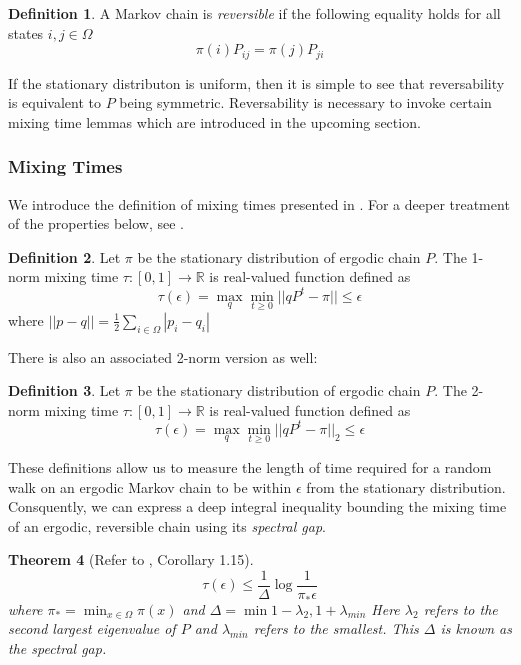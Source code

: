 \documentclass[12pt]{amsart}
\newtheorem{theorem}{Theorem}[section]
\theoremstyle{definition}
\newtheorem{definition}[theorem]{Definition}
\theoremstyle{remark}
\numberwithin{equation}{section}
\theoremstyle{remark}
\begin{document}
%
%
%
\begin{definition}
A Markov chain is \emph{reversible} if the following equality holds for all states $i,j \in \Omega$
\begin{equation}
  \pi(i)P_{ij} = \pi(j)P_{ji}
\end{equation}
\end{definition}
\noindent If the stationary distributon is uniform, then it is simple to see that reversability is equivalent to $P$ being symmetric. Reversability is necessary to invoke certain mixing time lemmas which are introduced in the upcoming section.

\subsubsection{Mixing Times}
We introduce the definition of mixing times presented in \cite{harrlow}. For a deeper treatment of the properties below, see \cite{montenegro}.
%
\begin{definition}
  Let $\pi$ be the stationary distribution of ergodic chain $P$. The 1-norm mixing time $\tau:[0,1] \rightarrow \mathbb{R}$ is real-valued function defined as
  \begin{equation}
    \tau(\epsilon) = \max_q \min_{t \geq 0} ||qP^t - \pi|| \leq \epsilon
  \end{equation}
  where $||p-q|| = \frac{1}{2}\sum_{i \in \Omega} |p_i - q_i|$
\end{definition}
%
\noindent  There is also an associated 2-norm version as well:
%
\begin{definition}
  Let $\pi$ be the stationary distribution of ergodic chain $P$. The 2-norm mixing time $\tau:[0,1] \rightarrow \mathbb{R}$ is real-valued function defined as
  \begin{equation}
    \tau(\epsilon) = \max_q \min_{t \geq 0} ||qP^t - \pi||_2 \leq \epsilon
  \end{equation}
\end{definition}
%
\noindent These definitions allow us to measure the length of time required for a random walk on an ergodic Markov chain to be within $\epsilon$ from the stationary distribution. Consquently, we can express a deep integral inequality bounding the mixing time of an ergodic, reversible chain using its \emph{spectral gap}.
%
\begin{theorem}[Refer to \cite{montenegro}, Corollary 1.15] \label{spectralgap}
  \begin{equation}
    \tau(\epsilon) \leq \frac{1}{\Delta}\log\frac{1}{\pi_*\epsilon}
  \end{equation}
  where $\pi_* = \min_{x \in \Omega} \pi(x)$ and $\Delta = \min{1 - \lambda_2, 1 + \lambda_{min}}$ Here $\lambda_2$ refers to the second largest eigenvalue of $P$ and $\lambda_{min}$ refers to the smallest. This $\Delta$ is known as the spectral gap.
\end{theorem}
\end{document}
